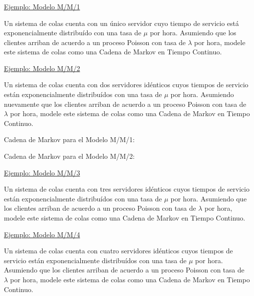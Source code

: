 \documentclass[ 10pt, xcolor = dvipsnames]{beamer}
\begin{document}
\begin{frame}[allowframebreaks]
\frametitle{\insertsubsection}

\underline{Ejemplo: Modelo M/M/1}

Un sistema de colas cuenta con un \'unico servidor cuyo tiempo de servicio est\'a exponencialmente distribu\'ido con una tasa de $\mu$ por hora. Asumiendo que los clientes arriban de acuerdo a un proceso Poisson con tasa de $\lambda$ por hora, modele este sistema de colas como una Cadena de Markov en Tiempo Continuo. 

\fullskip

\underline{Ejemplo: Modelo M/M/2}

Un sistema de colas cuenta con dos servidores id\'enticos cuyos tiempos de servicio est\'an exponencialmente distribu\'idos con una tasa de $\mu$ por hora. Asumiendo nuevamente que los clientes arriban de acuerdo a un proceso Poisson con tasa \linebreak de $\lambda$ por hora, modele este sistema de colas como una Cadena de Markov en \linebreak Tiempo Continuo. 

\framebreak

Cadena de Markov para el Modelo M/M/1: 
\begin{figure}[htb]
\centering
\def\svgwidth{0.75\columnwidth}

\end{figure}

Cadena de Markov para el Modelo M/M/2: 
\begin{figure}[htb]
\centering
\def\svgwidth{0.75\columnwidth}

\end{figure}

\framebreak

\underline{Ejemplo: Modelo M/M/3}

Un sistema de colas cuenta con tres servidores id\'enticos cuyos tiempos de servicio est\'an exponencialmente distribu\'idos con una tasa de $\mu$ por hora. Asumiendo que los clientes arriban de acuerdo a un proceso Poisson con tasa de $\lambda$ por hora, modele este sistema de colas como una Cadena de Markov en \linebreak Tiempo Continuo. 

\fullskip

\underline{Ejemplo: Modelo M/M/4}

Un sistema de colas cuenta con cuatro servidores id\'enticos cuyos tiempos de servicio est\'an exponencialmente distribu\'idos con una tasa de $\mu$ por hora. Asumiendo que los clientes arriban de acuerdo a un proceso Poisson con tasa \linebreak de $\lambda$ por hora, modele este sistema de colas como una Cadena de Markov en Tiempo Continuo. 


\end{frame}
\end{document}
